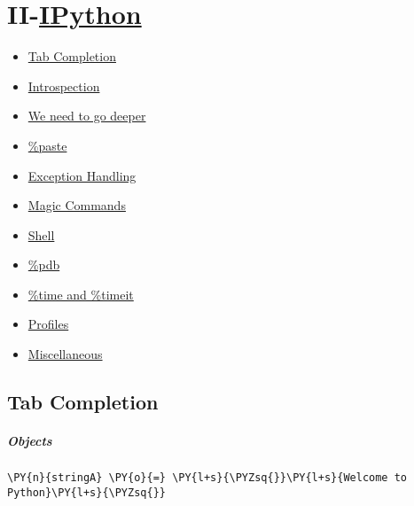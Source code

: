 






    
    \section{II-\href{http://ipython.org/}{IPython}}\label{ii-ipython}

    \begin{itemize}
\itemsep1pt\parskip0pt
\item
  \href{}{Tab Completion}
\item
  \href{}{Introspection}
\item
  \href{}{We need to go deeper}
\item
  \href{}{\%paste}
\item
  \href{}{Exception Handling}
\item
  \href{}{Magic Commands}
\item
  \href{}{Shell}
\item
  \href{}{\%pdb}
\item
  \href{}{\%time and \%timeit}
\item
  \href{}{Profiles}
\item
  \href{}{Miscellaneous}
\end{itemize}

    


    \subsection{Tab Completion}



    \subparagraph{Objects}



{\par%
\vspace{-1\baselineskip}%
}%
\begin{notebookcell}[17]%
\begin{addmargin}[\cellleftmargin]{0em}%
{\smaller%
\par%
%
\vspace{-1\smallerfontscale}%
\begin{Verbatim}[commandchars=\\\{\}]
\PY{n}{stringA} \PY{o}{=} \PY{l+s}{\PYZsq{}}\PY{l+s}{Welcome to Python}\PY{l+s}{\PYZsq{}}
\end{Verbatim}
%
\par%
\vspace{-1\smallerfontscale}}%
\end{addmargin}
\end{notebookcell}


